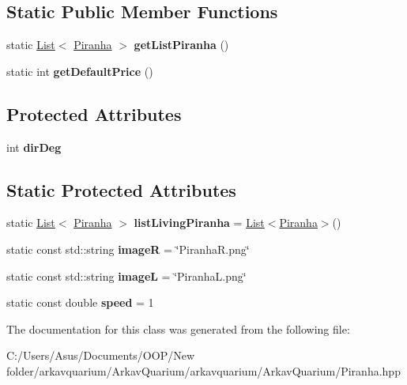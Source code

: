 \subsection*{Static Public Member Functions}
\begin{DoxyCompactItemize}
\item 
\mbox{\label{class_piranha_a13b5d6d16b3acf57600ebb9469167c34}} 
static \mbox{\hyperlink{class_list}{List}}$<$ \mbox{\hyperlink{class_piranha}{Piranha}} $>$ {\bfseries get\+List\+Piranha} ()
\item 
\mbox{\label{class_piranha_a564426290ce94192e99228666c0ff6dd}} 
static int {\bfseries get\+Default\+Price} ()
\end{DoxyCompactItemize}
\subsection*{Protected Attributes}
\begin{DoxyCompactItemize}
\item 
\mbox{\label{class_piranha_ac97ed41fa8005ea000f575474d704d34}} 
int {\bfseries dir\+Deg}
\end{DoxyCompactItemize}
\subsection*{Static Protected Attributes}
\begin{DoxyCompactItemize}
\item 
\mbox{\label{class_piranha_ada072bf3e7c4ed245886a625f56975d3}} 
static \mbox{\hyperlink{class_list}{List}}$<$ \mbox{\hyperlink{class_piranha}{Piranha}} $>$ {\bfseries list\+Living\+Piranha} = \mbox{\hyperlink{class_list}{List}}$<$\mbox{\hyperlink{class_piranha}{Piranha}}$>$()
\item 
\mbox{\label{class_piranha_abf426efae89471579ab3d4bc7a8f807b}} 
static const std\+::string {\bfseries imageR} = \char`\"{}Piranha\+R.\+png\char`\"{}
\item 
\mbox{\label{class_piranha_a0c22d519419dddd66584bf17a506433a}} 
static const std\+::string {\bfseries imageL} = \char`\"{}Piranha\+L.\+png\char`\"{}
\item 
\mbox{\label{class_piranha_aa3c9271841fbca5e85749386e86fb7b2}} 
static const double {\bfseries speed} = 1
\end{DoxyCompactItemize}


The documentation for this class was generated from the following file\+:\begin{DoxyCompactItemize}
\item 
C\+:/\+Users/\+Asus/\+Documents/\+O\+O\+P/\+New folder/arkavquarium/\+Arkav\+Quarium/arkavquarium/\+Arkav\+Quarium/Piranha.\+hpp\end{DoxyCompactItemize}

